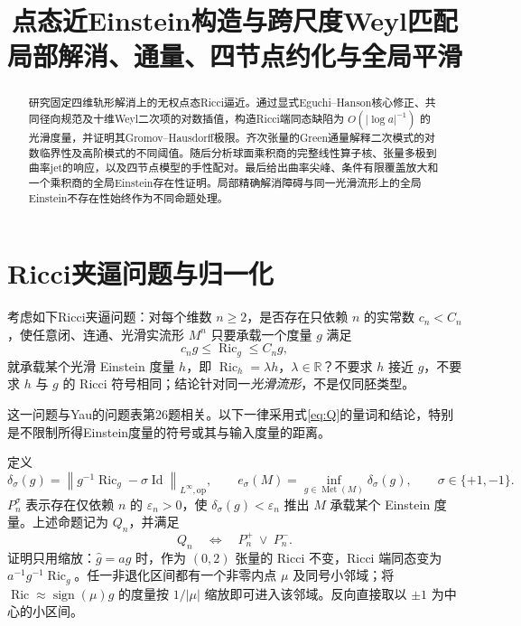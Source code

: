 \documentclass[UTF8,a4paper,11pt,fontset=fandol]{ctexart}
\title{点态近Einstein构造与跨尺度Weyl匹配\\[0.5em]{\large 局部解消、通量、四节点约化与全局平滑}}
\author{}
\date{}
\numberwithin{equation}{section}
\theoremstyle{definition}
\newcommand{\Ric}{\operatorname{Ric}}
\newcommand{\Met}{\operatorname{Met}}
\newcommand{\Id}{\operatorname{Id}}
\newcommand{\op}{\mathrm{op}}
\newcommand{\R}{\mathbb R}
\newcommand{\norm}[1]{\left\lVert#1\right\rVert}
\begin{document}
\maketitle
\begin{abstract}
研究固定四维轨形解消上的无权点态Ricci逼近。通过显式Eguchi--Hanson核心修正、共同径向规范及十维Weyl二次项的对数插值，构造Ricci端同态缺陷为 $O(|\log a|^{-1})$ 的光滑度量，并证明其Gromov--Hausdorff极限。齐次张量的Green通量解释二次模式的对数临界性及高阶模式的不同阈值。随后分析球面乘积商的完整线性算子核、张量多极到曲率jet的响应，以及四节点模型的手性配对。最后给出曲率尖峰、条件有限覆盖放大和一个乘积商的全局Einstein存在性证明。局部精确解消障碍与同一光滑流形上的全局Einstein不存在性始终作为不同命题处理。
\end{abstract}
\begingroup
\small\linespread{1.0}\selectfont\setlength{\parskip}{0pt}
\tableofcontents
\endgroup
\clearpage

\section{Ricci夹逼问题与归一化}
考虑如下Ricci夹逼问题：对每个维数 $n\ge2$，是否存在只依赖 $n$ 的实常数 $c_n<C_n$，使任意闭、连通、光滑实流形 $M^n$ 只要承载一个度量 $g$ 满足
\begin{equation}\label{eq:Q}
 c_ng\le\Ric_g\le C_ng,
\end{equation}
就承载某个光滑 Einstein 度量 $h$，即 $\Ric_h=\lambda h$，$\lambda\in\R$？不要求 $h$ 接近 $g$，不要求 $h$ 与 $g$ 的 Ricci 符号相同；结论针对同一\emph{光滑流形}，不是仅同胚类型。

这一问题与Yau的问题表第26题相关\cite{Yau1982}。以下一律采用式\eqref{eq:Q}的量词和结论，特别是不限制所得Einstein度量的符号或其与输入度量的距离。

定义
\begin{equation}\label{eq:defect}
 \delta_\sigma(g)=\norm{g^{-1}\Ric_g-\sigma\Id}_{L^\infty,\op},\qquad
 e_\sigma(M)=\inf_{g\in\Met(M)}\delta_\sigma(g),\qquad \sigma\in\{+1,-1\}.
\end{equation}
$P_n^\sigma$ 表示存在仅依赖 $n$ 的 $\varepsilon_n>0$，使 $\delta_\sigma(g)<\varepsilon_n$ 推出 $M$ 承载某个 Einstein 度量。上述命题记为 $Q_n$，并满足
\begin{equation}\label{eq:branches}
 Q_n\quad\Longleftrightarrow\quad P_n^+\ \lor\ P_n^-.
\end{equation}
证明只用缩放：$\widehat g=ag$ 时，作为 $(0,2)$ 张量的 Ricci 不变，Ricci 端同态变为 $a^{-1}g^{-1}\Ric_g$。任一非退化区间都有一个非零内点 $\mu$ 及同号小邻域；将 $\Ric\approx\operatorname{sign}(\mu)g$ 的度量按 $1/|\mu|$ 缩放即可进入该邻域。反向直接取以 $\pm1$ 为中心的小区间。
\end{document}
